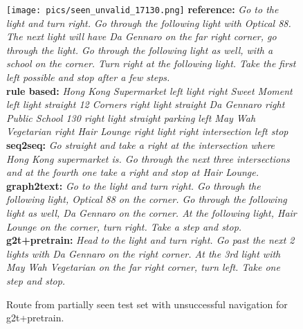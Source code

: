 \documentclass[11pt,a4paper]{article}
\begin{document}
\begin{figure*}[h]
    \texttt{[image: pics/seen\_unvalid\_17130.png]}
    \scriptsize
    \textbf{reference:} \textit{Go to the light and turn right. Go through the following light with Optical 88. The next light will have Da Gennaro on the far right corner, go through the light. Go through the following light as well, with a school on the corner. Turn right at the following light. Take the first left possible and stop after a few steps.} \\
    \textbf{rule based:} \textit{Hong Kong Supermarket left light right Sweet Moment left light straight 12 Corners right light straight Da Gennaro right Public School 130 right light straight parking left May Wah Vegetarian right Hair Lounge right light right intersection left stop}\\
    \textbf{seq2seq:} \textit{Go straight and take a right at the intersection where Hong Kong supermarket is. Go through the next three intersections and at the fourth one take a right and stop at Hair Lounge.}\\
    \textbf{graph2text:} \textit{Go to the light and turn right. Go through the following light, Optical 88 on the corner. Go through the following light as well, Da Gennaro on the corner. At the following light, Hair Lounge on the corner, turn right. Take a step and stop.}\\
    \textbf{g2t+pretrain:} \textit{Head to the light and turn right. Go past the next 2 lights with Da Gennaro on the right corner. At the 3rd light with May Wah Vegetarian on the far right corner, turn left. Take one step and stop.}
    \caption{Route from partially seen test set with unsuccessful navigation for g2t+pretrain.}
\end{figure*}
\end{document}
